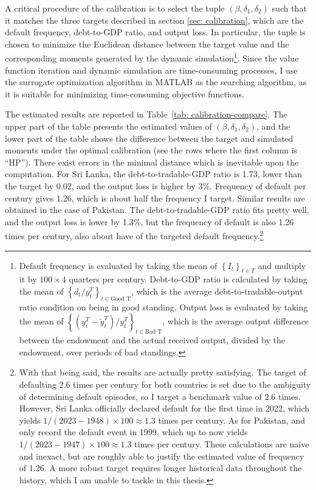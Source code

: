 A critical procedure of the calibration is to select the tuple $(\beta, \delta_1, \delta_2)$ such that it matches the three targets described in section \ref{sec: calibration}, which are the default frequency, debt-to-GDP ratio, and output loss.
In particular, the tuple is chosen to minimize the Euclidean distance between the target value and the corresponding moments generated by the dynamic simulation\footnote{
    Default frequency is evaluated by taking the mean of $\left\{ I_{t} \right\}_{t \in T}$ and multiply it by $100\times 4$ quarters per century. Debt-to-GDP ratio is calculated by taking the mean of $\left\{ d_t / y^T_t \right\}_{t \in \text{Good T}}$, which is the average debt-to-tradable-output ratio condition on being in good standing. Output loss is evaluated by taking the mean of $\left\{ (y^T_t - \tilde{y}^T_t)/y^T_t \right\}_{t \in \text{Bad T}}$, which is the average output difference between the endowment and the actual received output, divided by the endowment, over periods of bad standings.
}. Since the value function iteration and dynamic simulation are time-consuming processes, I use the surrogate optimization algorithm in MATLAB as the searching algorithm, as it is suitable for minimizing time-consuming objective functions.

The estimated results are reported in Table~\ref{tab: calibration-compare}.
The upper part of the table presents the estimated values of $(\beta, \delta_1, \delta_2)$, and the lower part of the table shows the difference between the target and simulated moments under the optimal calibration (see the rows where the first column is ``HP'').
There exist errors in the minimal distance which is inevitable upon the computation. For Sri Lanka, the debt-to-tradable-GDP ratio is 1.73, lower than the target by 0.02, and the output loss is higher by 3\%. Frequency of default per century gives 1.26, which is about half the frequency I target. Similar results are obtained in the case of Pakistan. The debt-to-tradable-GDP ratio fits pretty well, and the output loss is lower by 1.3\%, but the frequency of default is also 1.26 times per century, also about have of the targeted default frequency.\footnote{
    With that being said, the results are actually pretty satisfying. The target of defaulting 2.6 times per century for both countries is set due to the ambiguity of determining default episodes, so I target a benchmark value of 2.6 times. However, Sri Lanka officially declared default for the first time in 2022, which yields $1/(2023-1948) \times 100 \approx 1.3$ times per century. As for Pakistan, \citet{Uribe-Schmitt-Grohe-textbook} and \citet{SPGlobal-default-report} only record the default event in 1999, which up to now yields $1/(2023-1947) \times 100 \approx 1.3$ times per century. These calculations are naive and inexact, but are roughly able to justify the estimated value of frequency of 1.26. A more robust target requires longer historical data throughout the history, which I am unable to tackle in this thesis.
}